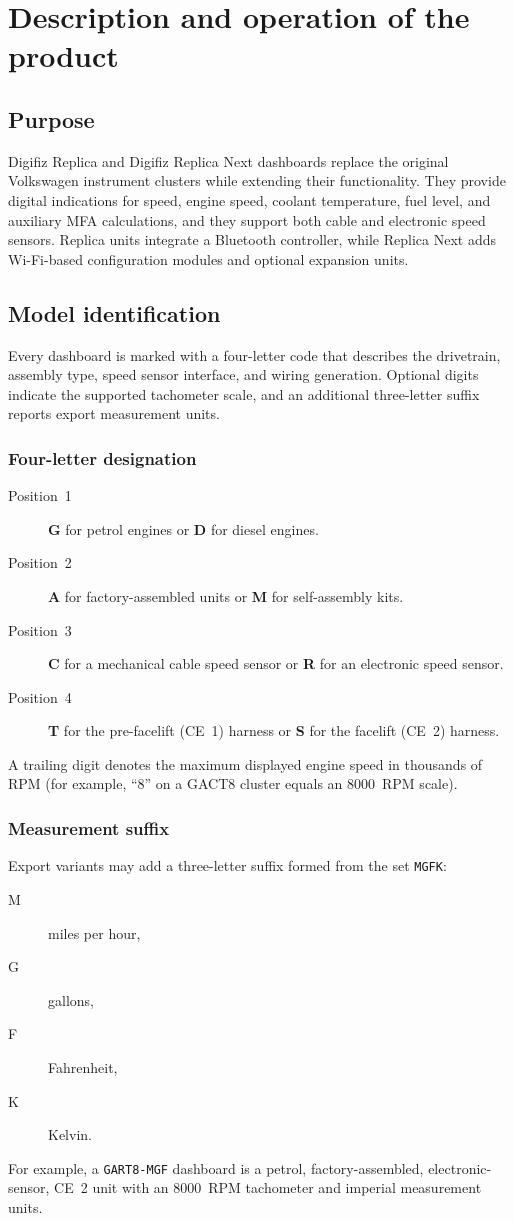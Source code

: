 \chapter{Description and operation of the product}\label{ch:description}

\section{Purpose}
Digifiz Replica and Digifiz Replica Next dashboards replace the original Volkswagen instrument clusters while extending their functionality. They provide digital indications for speed, engine speed, coolant temperature, fuel level, and auxiliary MFA calculations, and they support both cable and electronic speed sensors. Replica units integrate a Bluetooth controller, while Replica Next adds Wi-Fi-based configuration modules and optional expansion units.

\section{Model identification}
Every dashboard is marked with a four-letter code that describes the drivetrain, assembly type, speed sensor interface, and wiring generation. Optional digits indicate the supported tachometer scale, and an additional three-letter suffix reports export measurement units.

\subsection{Four-letter designation}
\begin{description}
    \item[Position~1] \textbf{G} for petrol engines or \textbf{D} for diesel engines.
    \item[Position~2] \textbf{A} for factory-assembled units or \textbf{M} for self-assembly kits.
    \item[Position~3] \textbf{C} for a mechanical cable speed sensor or \textbf{R} for an electronic speed sensor.
    \item[Position~4] \textbf{T} for the pre-facelift (CE~1) harness or \textbf{S} for the facelift (CE~2) harness.
\end{description}
A trailing digit denotes the maximum displayed engine speed in thousands of RPM (for example, “8” on a GACT8 cluster equals an 8000~RPM scale).

\subsection{Measurement suffix}
Export variants may add a three-letter suffix formed from the set \texttt{MGFK}:
\begin{description}
    \item[M] miles per hour,
    \item[G] gallons,
    \item[F] Fahrenheit,
    \item[K] Kelvin.
\end{description}
For example, a \texttt{GART8-MGF} dashboard is a petrol, factory-assembled, electronic-sensor, CE~2 unit with an 8000~RPM tachometer and imperial measurement units.

